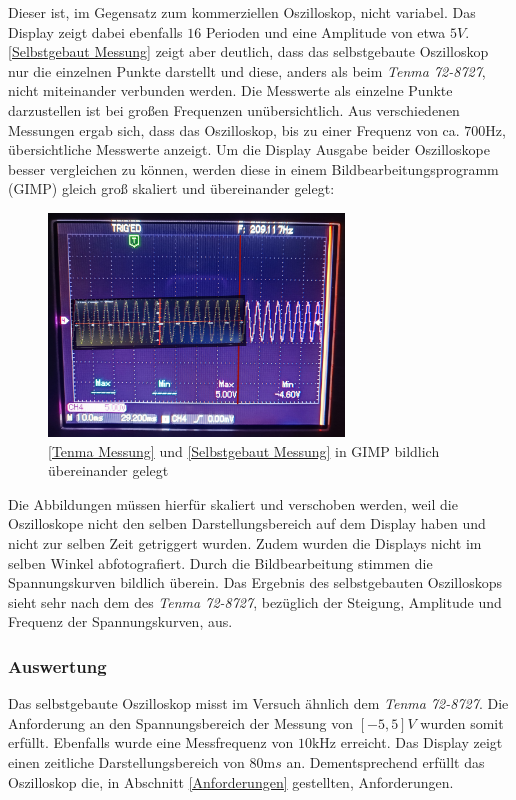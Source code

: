 Dieser ist, im Gegensatz zum kommerziellen Oszilloskop, nicht variabel.
Das Display zeigt dabei ebenfalls $16$ Perioden und eine Amplitude von etwa $5V$.
\autoref{Selbstgebaut Messung} zeigt aber deutlich, dass das selbstgebaute Oszilloskop nur die einzelnen Punkte
darstellt und diese, anders als beim \textit{Tenma 72-8727}, nicht miteinander verbunden werden.
Die Messwerte als einzelne Punkte darzustellen ist bei großen Frequenzen unübersichtlich.
Aus verschiedenen Messungen ergab sich, dass das Oszilloskop, bis zu einer
Frequenz von ca. $700 \si{\hertz}$, übersichtliche Messwerte anzeigt.
Um die Display Ausgabe beider Oszilloskope besser vergleichen zu können, werden diese in einem Bildbearbeitungsprogramm (GIMP) gleich groß skaliert und übereinander gelegt:
\begin{figure}[h]
	\centering
	\includegraphics[width=0.7\textwidth]{images/sinus_uebereinander.jpg}
	\caption{\autoref{Tenma Messung} und \autoref{Selbstgebaut Messung} in GIMP bildlich übereinander gelegt}
\end{figure}
\newline
Die Abbildungen müssen hierfür skaliert und verschoben werden, weil die Oszilloskope nicht den selben Darstellungsbereich auf dem Display haben und nicht zur selben Zeit getriggert wurden.
Zudem wurden die Displays nicht im selben Winkel abfotografiert.
Durch die Bildbearbeitung stimmen die Spannungskurven bildlich überein.
Das Ergebnis des selbstgebauten Oszilloskops sieht sehr nach dem des \textit{Tenma 72-8727}, bezüglich der Steigung, Amplitude und Frequenz der Spannungskurven, aus.


\subsubsection{Auswertung}
Das selbstgebaute Oszilloskop misst im Versuch ähnlich dem \textit{Tenma 72-8727}.
Die Anforderung an den Spannungsbereich der Messung von $[-5, 5] V$ wurden somit erfüllt.
Ebenfalls wurde eine Messfrequenz von $10 \si{\kilo \hertz}$ erreicht.
Das Display zeigt einen zeitliche Darstellungsbereich von $80\si{\milli s}$ an.
Dementsprechend erfüllt das Oszilloskop die, in Abschnitt \ref{Anforderungen} gestellten, Anforderungen.

